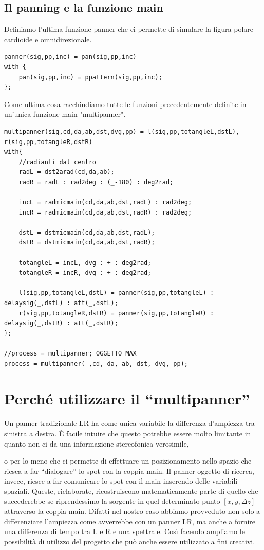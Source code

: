 \documentclass{article}
\begin{document}
\subsection{Il panning e la funzione main}
Definiamo l'ultima funzione panner che ci permette di simulare la figura polare cardioide e omnidirezionale. 
\begin{lstlisting}
panner(sig,pp,inc) = pan(sig,pp,inc)
with {
    pan(sig,pp,inc) = ppattern(sig,pp,inc); 
};
\end{lstlisting}

Come ultima cosa racchiudiamo tutte le funzioni precedentemente definite in un'unica funzione main "multipanner".

\begin{lstlisting}
multipanner(sig,cd,da,ab,dst,dvg,pp) = l(sig,pp,totangleL,dstL), r(sig,pp,totangleR,dstR)
with{
    //radianti dal centro
    radL = dst2arad(cd,da,ab);
    radR = radL : rad2deg : (_-180) : deg2rad;

    incL = radmicmain(cd,da,ab,dst,radL) : rad2deg;
    incR = radmicmain(cd,da,ab,dst,radR) : rad2deg;

    dstL = dstmicmain(cd,da,ab,dst,radL);
    dstR = dstmicmain(cd,da,ab,dst,radR);

    totangleL = incL, dvg : + : deg2rad;
    totangleR = incR, dvg : + : deg2rad;

    l(sig,pp,totangleL,dstL) = panner(sig,pp,totangleL) : delaysig(_,dstL) : att(_,dstL);
    r(sig,pp,totangleR,dstR) = panner(sig,pp,totangleR) : delaysig(_,dstR) : att(_,dstR);
};

//process = multipanner; OGGETTO MAX
process = multipanner(_,cd, da, ab, dst, dvg, pp);
\end{lstlisting}
\section{Perché utilizzare il ``multipanner''}
    
    Un panner tradizionale LR ha come unica variabile la differenza d'ampiezza tra sinistra a destra. È facile intuire che questo potrebbe essere molto limitante in quanto non ci da una informazione stereofonica verosimile,
    
    
     o per lo meno che ci permette di effettuare un posizionamento nello spazio che riesca a far ``dialogare'' lo spot con la coppia main. Il panner oggetto di ricerca, invece, riesce a far comunicare lo spot con il main inserendo delle variabili spaziali. 
    Queste, rielaborate, ricostruiscono matematicamente parte di quello che succederebbe se riprendessimo la sorgente in quel determinato punto $[x, y, \Delta z]$ attraverso la coppia main. 
    Difatti nel nostro caso abbiamo provveduto non solo a differenziare l'ampiezza come avverrebbe con un panner LR, ma anche a fornire una differenza di tempo tra L e R e una spettrale. Così facendo ampliamo le possibilità di utilizzo del progetto che può anche essere utilizzato a fini creativi.
\end{document}
